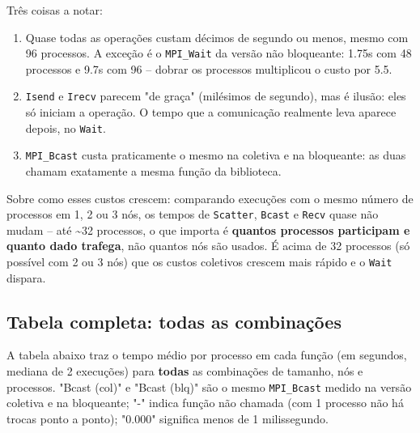 Três coisas a notar:

\begin{enumerate}
\tightlist
\item
  Quase todas as operações custam décimos de segundo ou menos, mesmo com
  96 processos. A exceção é o \texttt{MPI\_Wait} da versão não
  bloqueante: 1.75s com 48 processos e 9.7s com 96 -- dobrar os
  processos multiplicou o custo por 5.5.
\item
  \texttt{Isend} e \texttt{Irecv} parecem "de graça" (milésimos de
  segundo), mas é ilusão: eles só iniciam a operação. O tempo que a
  comunicação realmente leva aparece depois, no \texttt{Wait}.
\item
  \texttt{MPI\_Bcast} custa praticamente o mesmo na coletiva e na
  bloqueante: as duas chamam exatamente a mesma função da biblioteca.
\end{enumerate}

Sobre como esses custos crescem: comparando execuções com o mesmo número
de processos em 1, 2 ou 3 nós, os tempos de \texttt{Scatter},
\texttt{Bcast} e \texttt{Recv} quase não mudam -- até \textasciitilde32
processos, o que importa é \textbf{quantos processos participam e quanto
dado trafega}, não quantos nós são usados. É acima de 32 processos (só
possível com 2 ou 3 nós) que os custos coletivos crescem mais rápido e o
\texttt{Wait} dispara.

\subsection{Tabela completa: todas as
combinações}\label{tabela-completa-todas-as-combinauxe7uxf5es}

A tabela abaixo traz o tempo médio por processo em cada função (em
segundos, mediana de 2 execuções) para \textbf{todas} as combinações de
tamanho, nós e processos. "Bcast (col)" e "Bcast (blq)" são o mesmo
\texttt{MPI\_Bcast} medido na versão coletiva e na bloqueante; "-"
indica função não chamada (com 1 processo não há trocas ponto a ponto);
"0.000" significa menos de 1 milissegundo.

